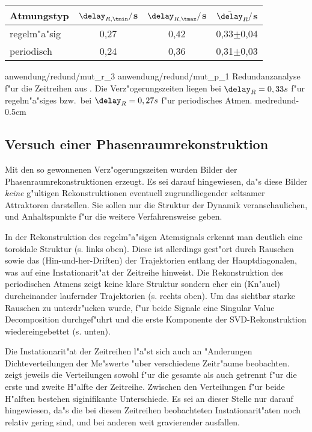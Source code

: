 \begin{center}
\begin{tabular}{|l||c|c|c|}
  \hline
  Atmungstyp & $\delay_{R,\tmin}/$s & $\delay_{R,\tmax}/$s & $\bar \delay_{R}/$s \\
  \hline
  regelm"a"sig   &  0,27 &  0,42   &  0,33$\pm$0,04 \\
  periodisch        &  0,24 &  0,36   &  0,31$\pm$0,03 \\
  \hline
\end{tabular}
\end{center}

\epsfigdouble
{anwendung/redund/mut_r_3}
{anwendung/redund/mut_p_1}
{Redundanzanalyse f"ur die Zeitreihen aus . Die Verz"ogerungszeiten
  liegen bei $\delay_R=0,33 s$ f"ur regelm"a"siges bzw.\ bei $\delay_R=0,27 s$ f"ur
  periodisches Atmen. 
}
{medredund}{-0.5cm}

\subsection{Versuch einer Phasenraumrekonstruktion}
Mit den so gewonnenen Verz"ogerungszeiten wurden Bilder der Phasenraumrekonstruktionen
erzeugt. Es sei darauf hingewiesen, da"s diese Bilder {\em keine} g"ultigen
Rekonstruktionen eventuell zugrundliegender seltsamer Attraktoren darstellen. Sie sollen
nur die Struktur der Dynamik veranschaulichen, und Anhaltspunkte f"ur die weitere
Verfahrensweise geben.

In der Rekonstruktion des regelm"a"sigen Atemsignals erkennt man deutlich eine toroidale
Struktur (s.  links oben). Diese ist allerdings gest"ort durch Rauschen
sowie das \naja(Hin-und-her-Driften) der Trajektorien entlang der Hauptdiagonalen, was auf
eine Instationarit"at der Zeitreihe hinweist. Die Rekonstruktion des periodischen Atmens
zeigt keine klare Struktur sondern eher ein \naja(Kn"auel) durcheinander laufernder
Trajektorien (s.  rechts oben).  Um das sichtbar starke Rauschen zu
unterdr"ucken wurde, f"ur beide Signale eine Singular Value Decomposition durchgef"uhrt und
die erste Komponente der SVD-Rekonstruktion wiedereingebettet (s. 
unten).

Die Instationarit"at der Zeitreihen l"a"st sich auch an "Anderungen Dichteverteilungen der
Me"swerte "uber verschiedene Zeitr"aume beobachten.  zeigt jeweils die
Verteilungen sowohl f"ur die gesamte als auch getrennt f"ur die erste und zweite H"alfte
der Zeitreihe. Zwischen den Verteilungen f"ur beide H"alften bestehen siginifikante
Unterschiede. Es sei an dieser Stelle nur darauf hingewiesen, da"s die bei diesen
Zeitreihen beobachteten Instationarit"aten noch relativ gering sind, und bei anderen weit
gravierender ausfallen.

